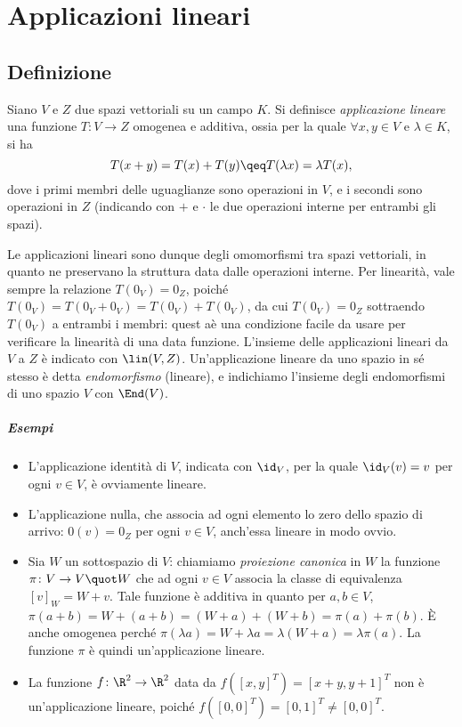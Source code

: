 \chapter{Applicazioni lineari}
\section{Definizione}
\begin{definizione} \label{d:applicazione-lineare}
	Siano $V$ e $Z$ due spazi vettoriali su un campo $K$.
	Si definisce \emph{applicazione lineare} una funzione $T\colon V\to Z$ omogenea e additiva, ossia per la quale $\forall  x,  y\in V$ e $\lambda\in K$, si ha
	\begin{equation*}
		T(x+y)=T(x)+T(y)\qeq T(\lambda x)=\lambda T(x),
	\end{equation*}
	dove i primi membri delle uguaglianze sono operazioni in $V$, e i secondi sono operazioni in $Z$ (indicando con $+$ e $\cdot$ le due operazioni interne per entrambi gli spazi).
\end{definizione}
Le applicazioni lineari sono dunque degli omomorfismi tra spazi vettoriali, in quanto ne preservano la struttura data dalle operazioni interne.
Per linearità, vale sempre la relazione $T(0_V)=0_Z$, poiché $T(0_V)=T(0_V+0_V)=T(0_V)+T(0_V)$, da cui $T(0_V)=0_Z$ sottraendo $T(0_V)$ a entrambi i membri: quest aè una condizione facile da usare per verificare la linearità di una data funzione.
L'insieme delle applicazioni lineari da $V$ a $Z$ è indicato con $\lin(V,Z)$.
Un'applicazione lineare da uno spazio in s\'e stesso è detta \emph{endomorfismo} (lineare), e indichiamo l'insieme degli endomorfismi di uno spazio $V$ con $\End(V)$.

\paragraph{Esempi}
\begin{itemize}
	\item L'applicazione identità di $V$, indicata con $\id_V$, per la quale $\id_V(v)=v$ per ogni $v\in V$, è ovviamente lineare.
	\item L'applicazione nulla, che associa ad ogni elemento lo zero dello spazio di arrivo: $0(v)=0_Z$ per ogni $v\in V$, anch'essa lineare in modo ovvio.
	\item Sia $W$ un sottospazio di $V$: chiamiamo \emph{proiezione canonica} in $W$ la funzione $\pi\colon V\to V\quot W$ che ad ogni $v\in V$ associa la classe di equivalenza $[v]_W=W+v$.
		Tale funzione è additiva in quanto per $a,b\in V$, $\pi(a+b)=W+(a+b)=(W+a)+(W+b)=\pi(a)+\pi(b)$.
		È anche omogenea perch\'e $\pi(\lambda a)=W+\lambda a=\lambda(W+a)=\lambda\pi(a)$.
		La funzione $\pi$ è quindi un'applicazione lineare.
	\item La funzione $f\colon\R^2\to\R^2$ data da $f([x,y]^T)=[x+y,y+1]^T$ non è un'applicazione lineare, poich\'e $f([0,0]^T)=[0,1]^T\ne[0,0]^T$.
\end{itemize}

